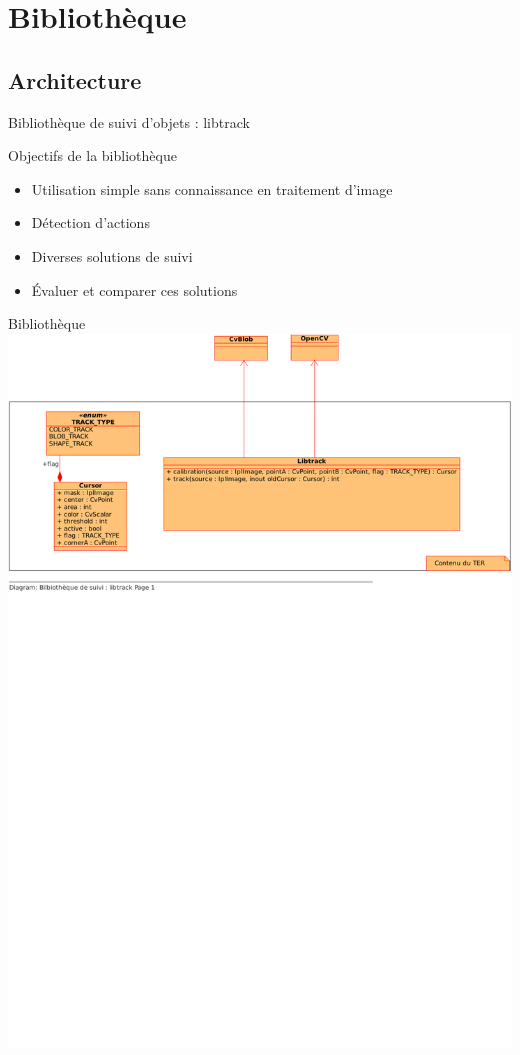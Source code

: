 \documentclass{beamer}
\begin{document}
      \section{Bibliothèque}
            \subsection{Architecture}
            \begin{frame}{Bibliothèque de suivi d'objets : libtrack}
                  \begin{block}{Objectifs de la bibliothèque}
                        \begin{itemize}
                        	\item{Utilisation simple sans connaissance en traitement d'image}
                        	\item{Détection d'actions}
                        	\item{Diverses solutions de suivi}
                        	\item{Évaluer et comparer ces solutions}
                        \end{itemize}
                  \end{block}
            \end{frame}

            \begin{frame}{Bibliothèque}
				\includegraphics[scale=0.59]{./libtrack-uml.pdf}
            \end{frame}
            
\end{document}
